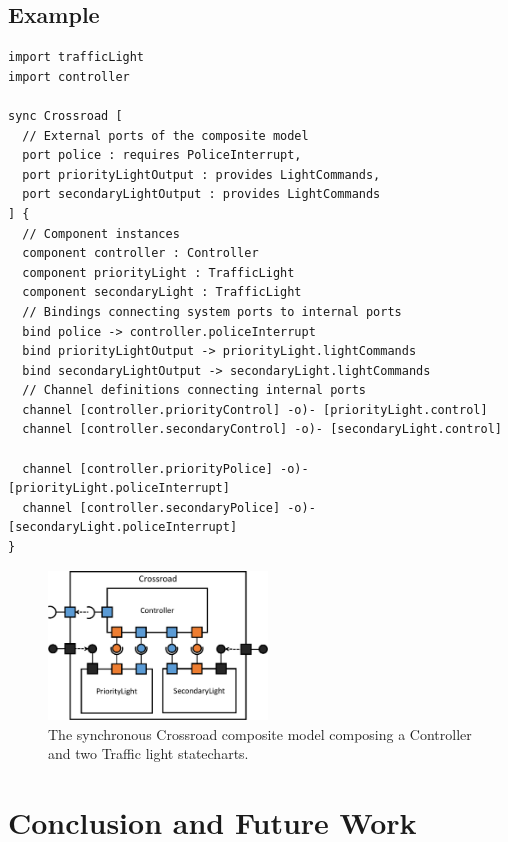 \documentclass[conference]{IEEEtran}
\begin{document}
\subsection{Example}

\begin{lstlisting}
import trafficLight
import controller

sync Crossroad [
  // External ports of the composite model
  port police : requires PoliceInterrupt,
  port priorityLightOutput : provides LightCommands,
  port secondaryLightOutput : provides LightCommands
] {
  // Component instances
  component controller : Controller
  component priorityLight : TrafficLight
  component secondaryLight : TrafficLight
  // Bindings connecting system ports to internal ports
  bind police -> controller.policeInterrupt
  bind priorityLightOutput -> priorityLight.lightCommands
  bind secondaryLightOutput -> secondaryLight.lightCommands
  // Channel definitions connecting internal ports
  channel [controller.priorityControl] -o)- [priorityLight.control]
  channel [controller.secondaryControl] -o)- [secondaryLight.control]

  channel [controller.priorityPolice] -o)- [priorityLight.policeInterrupt]
  channel [controller.secondaryPolice] -o)- [secondaryLight.policeInterrupt]
}
\end{lstlisting}

\begin{figure}[!h]
	\centering
	\includegraphics[width=0.52\textwidth]{figures/Controller-gcd.pdf}
	\caption{The synchronous Crossroad composite model composing a Controller and two Traffic light statecharts.}
	\label{fig:block_diagram_cropped2}
\end{figure}

\section{Conclusion and Future Work}
\label{sec:conclusion}
\end{document}
